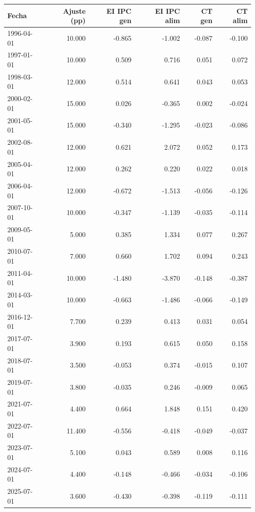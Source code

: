 \begin{tabular}{lrrrrr}
\toprule
Fecha & Ajuste (pp) & EI IPC gen & EI IPC alim & CT gen & CT alim\\
\midrule
1996-04-01 & 10.000 & -0.865 & -1.002 & -0.087 & -0.100\\
1997-01-01 & 10.000 & 0.509 & 0.716 & 0.051 & 0.072\\
1998-03-01 & 12.000 & 0.514 & 0.641 & 0.043 & 0.053\\
2000-02-01 & 15.000 & 0.026 & -0.365 & 0.002 & -0.024\\
2001-05-01 & 15.000 & -0.340 & -1.295 & -0.023 & -0.086\\
2002-08-01 & 12.000 & 0.621 & 2.072 & 0.052 & 0.173\\
2005-04-01 & 12.000 & 0.262 & 0.220 & 0.022 & 0.018\\
2006-04-01 & 12.000 & -0.672 & -1.513 & -0.056 & -0.126\\
2007-10-01 & 10.000 & -0.347 & -1.139 & -0.035 & -0.114\\
2009-05-01 & 5.000 & 0.385 & 1.334 & 0.077 & 0.267\\
2010-07-01 & 7.000 & 0.660 & 1.702 & 0.094 & 0.243\\
2011-04-01 & 10.000 & -1.480 & -3.870 & -0.148 & -0.387\\
2014-03-01 & 10.000 & -0.663 & -1.486 & -0.066 & -0.149\\
2016-12-01 & 7.700 & 0.239 & 0.413 & 0.031 & 0.054\\
2017-07-01 & 3.900 & 0.193 & 0.615 & 0.050 & 0.158\\
2018-07-01 & 3.500 & -0.053 & 0.374 & -0.015 & 0.107\\
2019-07-01 & 3.800 & -0.035 & 0.246 & -0.009 & 0.065\\
2021-07-01 & 4.400 & 0.664 & 1.848 & 0.151 & 0.420\\
2022-07-01 & 11.400 & -0.556 & -0.418 & -0.049 & -0.037\\
2023-07-01 & 5.100 & 0.043 & 0.589 & 0.008 & 0.116\\
2024-07-01 & 4.400 & -0.148 & -0.466 & -0.034 & -0.106\\
2025-07-01 & 3.600 & -0.430 & -0.398 & -0.119 & -0.111\\
\bottomrule
\end{tabular}
